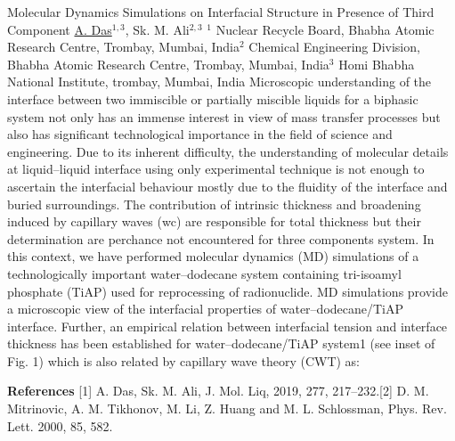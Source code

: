
    \begin{abstract_online}{Molecular Dynamics Simulations on Interfacial Structure in Presence of Third Component}{%
        \underline{A. Das}$^{1, 3}$, Sk. M. Ali$^{2, 3}$}{%
        }{%
        $^1$ Nuclear Recycle Board, Bhabha Atomic Research Centre, Trombay, Mumbai, India\newline{}$^2$ Chemical Engineering Division, Bhabha Atomic Research Centre, Trombay, Mumbai, India\newline{}$^3$ Homi Bhabha National Institute, trombay, Mumbai, India}
    Microscopic understanding of the interface between two immiscible or partially miscible liquids for a biphasic system not only has an immense interest in view of mass transfer processes but also has significant technological importance in the field of science and engineering. Due to its inherent difficulty, the understanding of molecular details at liquid–liquid interface using only experimental technique is not enough to ascertain the interfacial behaviour mostly due to the fluidity of the interface and buried surroundings. The contribution of intrinsic thickness and broadening induced by capillary waves (wc) are responsible for total thickness but their determination are perchance not encountered for three components system. In this context, we have performed molecular dynamics (MD) simulations of a technologically important water–dodecane system containing tri-isoamyl phosphate (TiAP) used for reprocessing of radionuclide. MD simulations provide a microscopic view of the interfacial properties of water–dodecane/TiAP interface. Further, an empirical relation between interfacial tension and interface thickness has been established for water–dodecane/TiAP system1 (see inset of Fig. 1) which is also related by capillary wave theory (CWT) as:  
    
        \textbf{References} \newline{}[1] A. Das, Sk. M. Ali, J. Mol. Liq, 2019, 277, 217–232.\newline{}[2] D. M. Mitrinovic, A. M. Tikhonov, M. Li, Z. Huang and M. L. Schlossman, Phys. Rev. Lett. 2000, 85, 582.
    \end{abstract_online}
    
